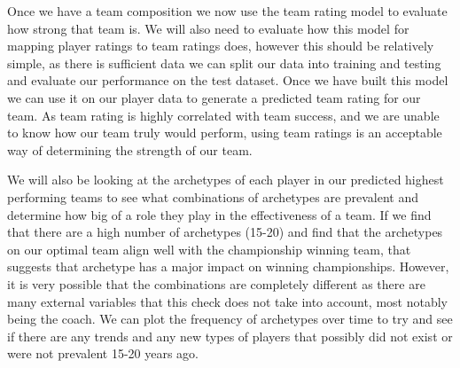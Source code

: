 \documentclass[12pt, letterpaper, titlepage]{article}
\begin{document}
Once we have a team composition we now use the team rating model to evaluate how strong that team is. We will also need to evaluate how this model for mapping player ratings to team ratings does, however this should be relatively simple, as there is sufficient data we can split our data into training and testing and evaluate our performance on the test dataset. Once we have built this model we can use it on our player data to generate a predicted team rating for our team. As team rating is highly correlated with team success, and we are unable to know how our team truly would perform, using team ratings is an acceptable way of determining the strength of our team. 

We will also be looking at the archetypes of each player in our predicted highest performing teams to see what combinations of archetypes are prevalent and determine how big of a role they play in the effectiveness of a team. If we find that there are a high number of archetypes (15-20) and find that the archetypes on our optimal team align well with the championship winning team, that suggests that archetype has a major impact on winning championships. However, it is very possible that the combinations are completely different as there are many external variables that this check does not take into account, most notably being the coach. We can plot the frequency of archetypes over time to try and see if there are any trends and any new types of players that possibly did not exist or were not prevalent 15-20 years ago.




\end{document}
